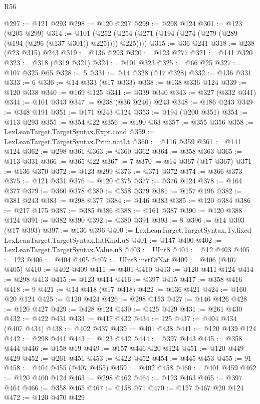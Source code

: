\begin{lexlean}{R56}
\begin{coremodule}
@297 := @121 @293
@298 := @120 @297
@299 := @298 @124
@301 := @123 (@205 @299)
@314 := @101 (@252 (@254 (@271 (@194 (@274 (@279 (@289 (@194 (@296 (@137 @301)) @225)))) @225))))
@315 := @36 @241
@318 := @238 (@23 @315) @243
@319 := @136 @293
@320 := @123 @277
@321 := @141 @320
@323 := @318 (@319 @321)
@324 := @101 @323
@325 := @66 @25
@327 := @107 @325 @65
@328 := 5
@331 := @14 @328 (@17 @328)
@332 := @136 @331
@333 := 6
@336 := @14 @333 (@17 @333)
@338 := @138 @336 @124
@339 := @120 @338
@340 := @169 @125
@341 := @339 @340
@343 := @327 (@332 @341)
@344 := @101 @343
@347 := @238 (@36 @246) @243
@348 := @186 @243
@349 := @348 @191
@351 := @171 @243 @124
@353 := @194 (@200 @351)
@354 := @113 @293
@355 := @354 @22
@356 := @190 @63
@357 := @355 @356
@358 := LexLeanTarget.TargetSyntax.Expr.cond
@359 := LexLeanTarget.TargetSyntax.Prim.natLt
@360 := @116 @359
@361 := @141 @124
@362 := @298 @361
@363 := @360 @362
@364 := @358 @363
@365 := @113 @331
@366 := @365 @22
@367 := 7
@370 := @14 @367 (@17 @367)
@371 := @136 @370
@372 := @123 @299
@373 := @371 @372
@374 := @366 @373
@375 := @121 @331
@376 := @120 @375
@377 := @376 @124
@378 := @164 @377
@379 := @360 @378
@380 := @358 @379
@381 := @157 @196
@382 := @381 @243
@383 := @298 @377
@384 := @146 @383
@385 := @120 @384
@386 := @217 @175
@387 := @385 @386
@388 := @161 @387
@390 := @120 @388 @124
@391 := @382 @390
@392 := @380 @391
@393 := 8
@396 := @14 @393 (@17 @393)
@397 := @136 @396
@400 := LexLeanTarget.TargetSyntax.Ty.fixed LexLeanTarget.TargetSyntax.IntKind.u8
@401 := @147 @400
@402 := LexLeanTarget.TargetSyntax.Value.u8
@403 := UInt8
@404 := @12 @403
@405 := 123
@406 := @404 @405
@407 := UInt8.instOfNat
@409 := @406 (@407 @405)
@410 := @402 @409
@411 := @401 @410
@413 := @120 @411 @124
@414 := @298 @413
@415 := @123 @414
@416 := @397 @415
@417 := @358 @416
@418 := 9
@421 := @14 @418 (@17 @418)
@422 := @136 @421
@424 := @160 @20 @124
@425 := @120 @424
@426 := @298 @153
@427 := @146 @426
@428 := @120 @427
@429 := @428 @124
@430 := @425 @429
@431 := @261 @430
@432 := @422 @431
@433 := @417 @432
@434 := 125
@437 := @404 @434 (@407 @434)
@438 := @402 @437
@439 := @401 @438
@441 := @120 @439 @124
@442 := @298 @441
@443 := @123 @442
@444 := @397 @443
@445 := @358 @444
@446 := @158 @19
@449 := @157 @446 @20 @124
@451 := @120 @449 @429
@452 := @261 @451
@453 := @422 @452
@454 := @445 @453
@455 := 91
@458 := @404 @455 (@407 @455)
@459 := @402 @458
@460 := @401 @459
@462 := @120 @460 @124
@463 := @298 @462
@464 := @123 @463
@465 := @397 @464
@466 := @358 @465
@467 := @158 @71
@470 := @157 @467 @20 @124
@472 := @120 @470 @429

\end{coremodule}
\end{lexlean}
